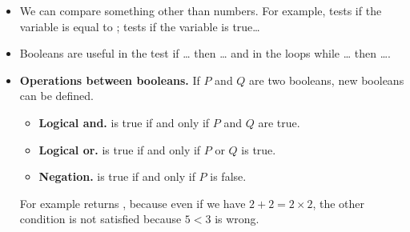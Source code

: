 \documentclass[11pt,class=report,crop=false]{standalone}
\begin{document}
\begin{cours}[Booleans]
\begin{itemize}
  \item We can compare something other than numbers. For example,  
  \og{}\fg{} tests if the variable  is equal to ; \og{}\fg{} tests if the variable  is true\ldots
  
  \item Booleans are useful in the test \og{}if \ldots{} then \ldots\fg{} and in the loops \og{}while \ldots{} then \ldots\fg{}.
  
  \item \textbf{Operations between booleans.}
  If $P$ and $Q$ are two booleans, new booleans can be defined.
  \begin{itemize}
    \item \textbf{Logical and.}\quad\og{}\fg{} is true if and only if $P$ and $Q$ are true.
    	\item \textbf{Logical or.}\quad \og{}\fg{} is true if and only if $P$ or $Q$ is true.
    	\item \textbf{Negation.}\quad \og{}\fg{} is true if and only if $P$ is false.
  \end{itemize}  
  
  For example \og{}\fg{} returns , because
  even if we have $2+2 = 2 \times 2$, the other condition is not satisfied because $5 < 3$ is wrong.
  
  
  
\end{itemize}
\end{cours}




\end{document}
